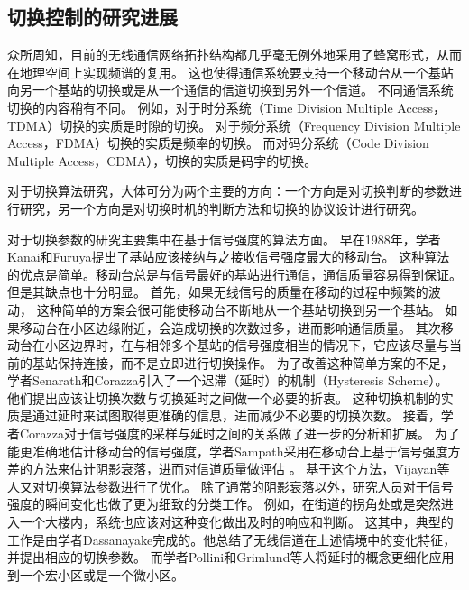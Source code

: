 \subsection{切换控制的研究进展}

\par 
众所周知，目前的无线通信网络拓扑结构都几乎毫无例外地采用了蜂窝形式，从而在地理空间上实现频谱的复用。
这也使得通信系统要支持一个移动台从一个基站向另一个基站的切换或是从一个通信的信道切换到另外一个信道。
不同通信系统切换的内容稍有不同。
例如，对于时分系统（Time Division Multiple Access，TDMA）切换的实质是时隙的切换。
对于频分系统（Frequency Division Multiple Access，FDMA）切换的实质是频率的切换。
而对码分系统（Code Division Multiple Access，CDMA），切换的实质是码字的切换。

对于切换算法研究，大体可分为两个主要的方向：一个方向是对切换判断的参数进行研究，另一个方向是对切换时机的判断方法和切换的协议设计进行研究。

对于切换参数的研究主要集中在基于信号强度的算法方面。
早在1988年，学者Kanai和Furuya提出了基站应该接纳与之接收信号强度最大的移动台\cite{Kanai1988}。
这种算法的优点是简单。移动台总是与信号最好的基站进行通信，通信质量容易得到保证。
但是其缺点也十分明显。
首先，如果无线信号的质量在移动的过程中频繁的波动，
这种简单的方案会很可能使移动台不断地从一个基站切换到另一个基站。
如果移动台在小区边缘附近，会造成切换的次数过多，进而影响通信质量。
其次移动台在小区边界时，在与相邻多个基站的信号强度相当的情况下，它应该尽量与当前的基站保持连接，而不是立即进行切换操作。
为了改善这种简单方案的不足，学者Senarath和Corazza引入了一个迟滞（延时）的机制（Hysteresis Scheme）\cite{345338}。
他们提出应该让切换次数与切换延时之间做一个必要的折衷。
这种切换机制的实质是通过延时来试图取得更准确的信息，进而减少不必要的切换次数。
接着，学者Corazza对于信号强度的采样与延时之间的关系做了进一步的分析和扩展\cite{345424}。
为了能更准确地估计移动台的信号强度，学者Sampath采用在移动台上基于信号强度方差的方法来估计阴影衰落，进而对信道质量做评估 \cite{368926}。
基于这个方法，Vijayan等人又对切换算法参数进行了优化\cite{528368}。
除了通常的阴影衰落以外，研究人员对于信号强度的瞬间变化也做了更为细致的分类工作。
例如，在街道的拐角处或是突然进入一个大楼内，系统也应该对这种变化做出及时的响应和判断\cite{350270}。
这其中，典型的工作是由学者Dassanayake完成的\cite{220848}。他总结了无线信道在上述情境中的变化特征，并提出相应的切换参数。
而学者Pollini和Grimlund等人将延时的概念更细化应用到一个宏小区或是一个微小区\cite{486807}\cite{140543}。


